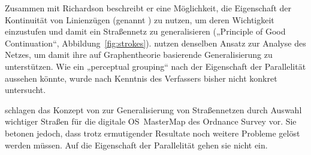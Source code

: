 \documentclass[../main/thesis.tex]{subfiles}
\begin{document}
Zusammen mit Richardson beschreibt er eine Möglichkeit, die Eigenschaft der Kontinuität von Linienzügen (genannt ) zu nutzen, um deren Wichtigkeit einzustufen und damit ein Straßennetz zu generalisieren („Principle of Good Continuation“, Abbildung~\ref{fig:strokes}). 
 nutzen denselben Ansatz zur Analyse des Netzes, um damit ihre auf Graphentheorie basierende Generalisierung zu unterstützen. 
Wie ein „perceptual grouping“ nach der Eigenschaft der Parallelität aussehen könnte, wurde nach Kenntnis des Verfassers bisher nicht konkret untersucht.



 schlagen das Konzept von  zur Generalisierung von Straßennetzen durch Auswahl wichtiger Straßen für die digitale OS~MasterMap des Ordnance Survey vor.
Sie betonen jedoch, dass trotz ermutigender Resultate noch weitere Probleme gelöst werden müssen.
Auf die Eigenschaft der Parallelität gehen sie nicht ein. 

\end{document}

